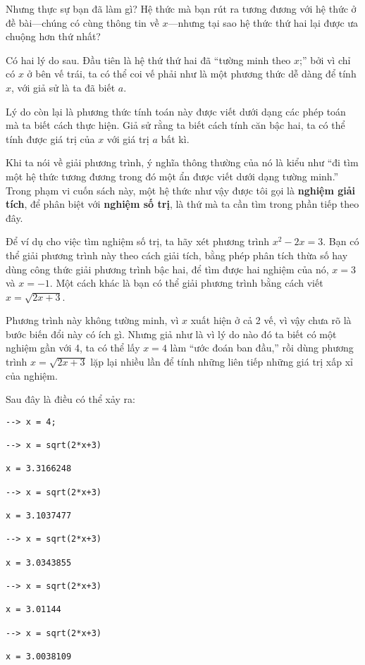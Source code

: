 \documentclass[12pt]{book}
\begin{document}
Nhưng thực sự bạn đã làm gì? Hệ thức mà bạn rút ra tương đương
với hệ thức ở đề bài---chúng có cùng thông tin về $x$---nhưng
tại sao hệ thức thứ hai lại được ưa chuộng hơn thứ nhất?

Có hai lý do sau. Đầu tiên là hệ thứ thứ hai đã ``tường minh
theo $x$;'' bởi vì chỉ có $x$ ở bên vế trái, ta có thể coi vế phải
như là một phương thức dễ dàng để tính $x$, với giả sử là ta
đã biết $a$.

Lý do còn lại là phương thức tính toán này được viết dưới dạng các
phép toán mà ta biết cách thực hiện. Giả sử rằng ta biết cách tính
căn bậc hai, ta có thể tính được giá trị của $x$ với giá trị $a$ bất kì.

Khi ta nói về giải phương trình, ý nghĩa thông thường của nó là 
kiểu như ``đi tìm một hệ thức tương đương trong đó một ẩn được
viết dưới dạng tường minh.'' Trong phạm vi cuốn sách này, một
hệ thức như vậy được tôi gọi là {\bf nghiệm giải tích}, để phân biệt
với {\bf nghiệm số trị}, là thứ mà ta cần tìm trong phần tiếp theo đây.

Để ví dụ cho việc tìm nghiệm số trị, ta hãy xét phương trình $x^2 - 2x = 3$. 
Bạn có thể giải phương trình này theo cách giải tích, bằng phép
phân tích thừa số hay dùng công thức giải phương trình bậc hai, để
tìm được hai nghiệm của nó, $x=3$ và $x=-1$. Một cách khác là bạn
có thể giải phương trình bằng cách viết $x = \sqrt{2x+3}$.

Phương trình này không tường minh, vì $x$ xuất hiện ở cả 2 vế, 
vì vậy chưa rõ là bước biến đổi này có ích gì. Nhưng giả như là
vì lý do nào đó ta biết có một nghiệm gần với 4, ta có thể 
lấy $x=4$ làm ``ước đoán ban đầu,'' rồi dùng phương trình
$x = \sqrt{2x+3}$ lặp lại nhiều lần để tính những liên tiếp những
giá trị xấp xỉ của nghiệm.

Sau đây là điều có thể xảy ra:

\begin{verbatim}
--> x = 4;

--> x = sqrt(2*x+3)

x = 3.3166248

--> x = sqrt(2*x+3)

x = 3.1037477

--> x = sqrt(2*x+3)

x = 3.0343855

--> x = sqrt(2*x+3)

x = 3.01144

--> x = sqrt(2*x+3)

x = 3.0038109
\end{verbatim}
\end{document}
